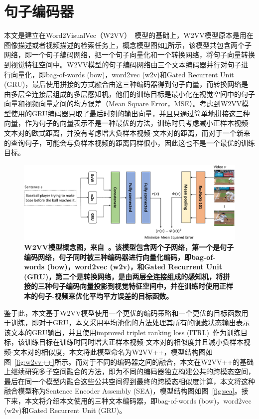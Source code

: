 \section{句子编码器}
本文是建立在Word2VisualVec（W2VV）~\cite{dong2018predicting}模型的基础上，W2VV模型原本是用在图像描述或者视频描述的检索任务上，概念模型图如\ref{fig:base-w2vv}所示，该模型共包含两个子网络，即一个句子编码网络，把一个句子向量化和一个转换网络，将句子向量转换到视觉特征空间中。W2VV模型的句子编码网络由三个文本编码器并行对句子进行向量化，即bag-of-words (bow)，word2vec (w2v)和Gated Recurrent Unit (GRU)，最后使用拼接的方式融合由这三种编码器得到句子向量，而转换网络是由多层全连接层组成的多层感知机，他们的训练目标是最小化在视觉空间中的句子向量和视频向量之间的均方误差（Mean Square Error，MSE）。考虑到W2VV模型使用的GRU编码器只取了最后时刻的输出向量，并且只通过简单地拼接这三种向量，作为句子的向量表示不是一种最优的方法，训练时只考虑减小正样本视频-文本对的欧式距离，并没有考虑增大负样本视频-文本对的距离，而对于一个新来的查询句子，可能会与负样本视频的距离同样很小，因此这也不是一个最优的训练目标。
\begin{figure}[tbh!]
    \centering
    \includegraphics[width=\linewidth]{figures/w2vv-model}
    \caption[Dong等人~\cite{dong2018predicting}提出的W2VV模型的概念图]{\textbf{W2VV模型概念图，来自~\cite{li2017multi}。该模型包含两个子网络，第一个是句子编码网络，句子同时被三种编码器进行向量化编码，即bag-of-words (bow)，word2vec (w2v)，和Gated Recurrent Unit (GRU)，第二个是转换网络，是由两层全连接组成的感知机，将拼接的三种句子编码向量投影到视觉特征空间中，并在训练时使用正样本的句子-视频来优化平均平方误差的目标函数。}}
    \label{fig:base-w2vv}
\end{figure}

鉴于此，本文基于W2VV模型使用一个更优的编码策略和一个更优的目标函数用于训练，即对于GRU，本文采用平均池化的方法处理其所有的隐藏状态输出表示该文本的GRU输出，并且使用improved triplet ranking loss (ITRL)~\cite{faghri2017vse++}作为训练目标，该训练目标在训练时同时增大正样本视频-文本对的相似度并且减小负样本视频-文本对的相似度，本文将此模型命名为W2VV++，模型结构图如图~\ref{fig:w2vv++}所示。而对于不同的编码器之间的融合，本文在W2VV++的基础上继续研究多子空间融合的方法，即为不同的编码器独立构建公共的跨模态空间，最后在同一个模型内融合这些公共空间得到最终的跨模态相似度计算，本文将这种融合模型称为Sentence Encoder Assembly (SEA)，模型结构图如图~\ref{fig:sea}。接下来，本文将介绍本文使用的三种文本编码器，即bag-of-words (bow)，word2vec (w2v)和Gated Recurrent Unit (GRU)。

